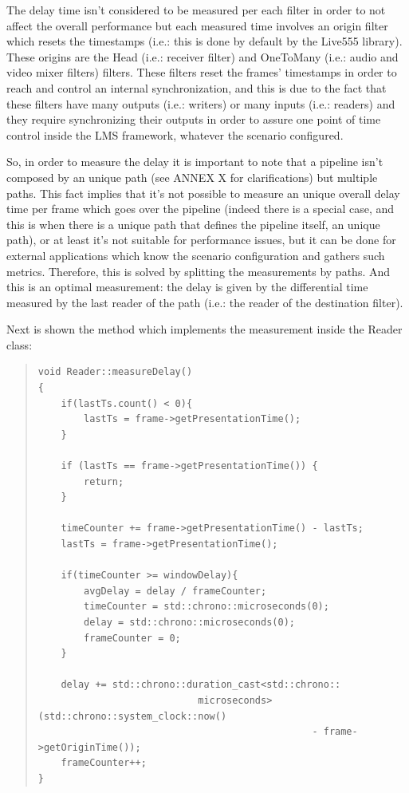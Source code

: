 The delay time isn't considered to be measured per each filter in order to not affect the overall performance but each measured time involves an origin filter which resets the timestamps (i.e.: this is done by default by the Live555 library). These origins are the Head (i.e.: receiver filter) and OneToMany (i.e.: audio and video mixer filters) filters. These filters reset the frames' timestamps in order to reach and control an internal synchronization, and this is due to the fact that these filters have many outputs (i.e.: writers) or many inputs (i.e.: readers) and they require synchronizing their outputs in order to assure one point of time control inside the LMS framework, whatever the scenario configured.

So, in order to measure the delay it is important to note that a pipeline isn't composed by an unique path (see ANNEX X for clarifications) but multiple paths. This fact implies that it's not possible to measure an unique overall delay time per frame which goes over the pipeline (indeed there is a special case, and this is when there is a unique path that defines the pipeline itself, an unique path), or at least it's not suitable for performance issues, but it can be done for external applications which know the scenario configuration and gathers such metrics. Therefore, this is solved by splitting the measurements by paths. And this is an optimal measurement: the delay is given by the differential time measured by the last reader of the path (i.e.: the reader of the destination filter).

Next is shown the method which implements the measurement inside the Reader class:

\begin{quote}
\begin{verbatim}
void Reader::measureDelay()
{
    if(lastTs.count() < 0){
        lastTs = frame->getPresentationTime();
    }

    if (lastTs == frame->getPresentationTime()) {
        return;
    }

    timeCounter += frame->getPresentationTime() - lastTs;
    lastTs = frame->getPresentationTime();

    if(timeCounter >= windowDelay){
        avgDelay = delay / frameCounter;
        timeCounter = std::chrono::microseconds(0);
        delay = std::chrono::microseconds(0);
        frameCounter = 0;
    }
    
    delay += std::chrono::duration_cast<std::chrono::
    						microseconds>(std::chrono::system_clock::now() 
    											- frame->getOriginTime());
    frameCounter++;
}
\end{verbatim}
\end{quote} 

